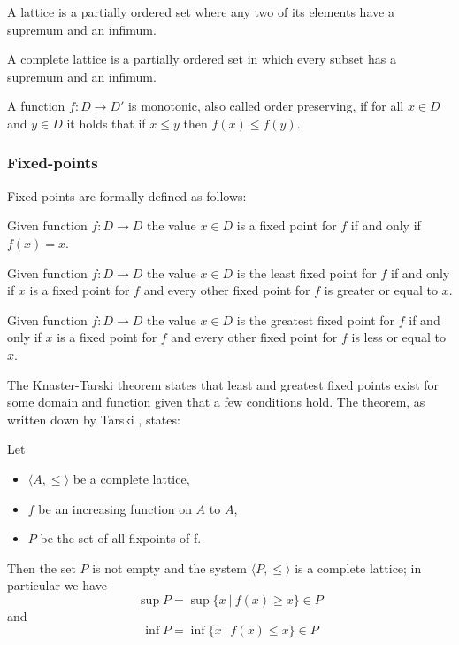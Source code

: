 \begin{definition}
	A lattice is a partially ordered set where any two of its elements have a supremum and an infimum.
\end{definition}

\begin{definition}
	A complete lattice is a partially ordered set in which every subset has a supremum and an infimum.
\end{definition}

\begin{definition}
	A function $f : D \rightarrow D'$ is monotonic, also called order preserving, if for all $x \in D$ and $y \in D$ it holds that if $x \leq y$ then $f(x) \leq f(y)$.
\end{definition}
\subsubsection{Fixed-points}
Fixed-points are formally defined as follows:
\begin{definition}
	Given function $f : D \rightarrow D$ the value $x \in D$ is a fixed point for $f$ if and only if $f(x) = x$.
\end{definition}
\begin{definition}
	Given function $f : D \rightarrow D$ the value $x \in D$ is the least fixed point for $f$ if and only if $x$ is a fixed point for $f$ and every other fixed point for $f$ is greater or equal to $x$.
\end{definition}
\begin{definition}
	Given function $f : D \rightarrow D$ the value $x \in D$ is the greatest fixed point for $f$ if and only if $x$ is a fixed point for $f$ and every other fixed point for $f$ is less or equal to $x$.
\end{definition}
The Knaster-Tarski theorem states that least and greatest fixed points exist for some domain and function given that a few conditions hold.
The theorem, as written down by Tarski \cite{tarski1955}, states:
\begin{theorem}
	\label{the_knaster_tarski}
	Let
	\begin{itemize}
		\item $\langle A, \leq \rangle$ be a complete lattice,
		\item $f$ be an increasing function on $A$ to $A$,
		\item $P$ be the set of all fixpoints of f.
	\end{itemize}
	Then the set $P$ is not empty and the system $\langle P, \leq \rangle$ is a complete lattice; in particular we have 
	\[ \sup P = \sup \{ x\ |\ f(x) \geq x \} \in P \]
	and
	\[ \inf P = \inf \{ x\ |\ f(x) \leq x \} \in P \]
\end{theorem}
